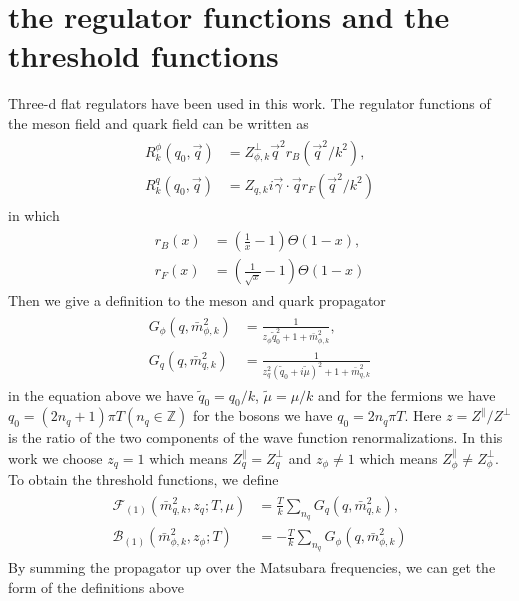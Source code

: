 \documentclass[%
reprint,
superscriptaddress,
showpacs,preprintnumbers,
 amsmath,amssymb,
 aps,
prd,
]{revtex4-1}
\begin{document}
\section{the regulator functions and the threshold functions}\label{a}
Three-d flat regulators have been used in this work. The regulator functions of the meson field and quark field can be 
written as
\begin{align}
\begin{split}
R^{\phi}_{k}(q_0,\vec{q})&=Z^{\bot}_{\phi,k}\vec{q}^2r_B(\vec{q}^2/k^2) ,\\
R^{q}_{k}(q_0,\vec{q})&=Z_{q,k}i\vec{\gamma}\cdot\vec{q}r_F(\vec{q}^2/k^2)
\end{split}
\end{align} 
in which
\begin{align}
\begin{split}
r_B(x)&=\left( \frac{1}{x}-1 \right)\Theta(1-x) ,\\
r_F(x)&=\left( \frac{1}{\sqrt{x}}-1 \right)\Theta(1-x)
\end{split}
\end{align} 
Then we give a definition to the meson and quark propagator
\begin{align}
\begin{split}
G_\phi(q,\bar{m}^{2}_{\phi,k})&=\frac{1}{z_\phi\tilde{q}^{2}_{0}+1+\bar{m}^{2}_{\phi,k}} ,\\
G_q(q,\bar{m}^{2}_{q,k})&=\frac{1}{z^{2}_{q}(\tilde{q}_0+i\tilde{\mu})^2+1+\bar{m}^{2}_{q,k}}
\end{split}
\end{align} 
in the equation above we have $\tilde{q}_0=q_0/k$, $\tilde{\mu}=\mu/k$ and for the fermions we have
$q_0=(2n_q+1)\pi T (n_q\in \mathbb{Z})$ for the bosons we have $q_0=2n_q\pi T$. Here $z=Z^\|/Z^\bot$ is the ratio of the 
two components of the wave function renormalizations. In this work we choose $z_q=1$ which means $Z^{\|}_{q}=
Z^{\bot}_{q}$ and $z_\phi\neq 1$ which means $Z^{\|}_{\phi}\neq Z^{\bot}_{\phi}$. To obtain the threshold functions, we 
define
\begin{align}
\begin{split}
\mathcal{F}_{(1)}(\bar{m}^{2}_{q,k},z_q;T,\mu)&=\frac{T}{k}\sum_{n_q}G_q(q,\bar{m}^{2}_{q,k}),\\
\mathcal{B}_{(1)}(\bar{m}^{2}_{\phi,k},z_\phi;T)&=-\frac{T}{k}\sum_{n_q}G_\phi(q,\bar{m}^{2}_{\phi,k})
\end{split}
\end{align} 
By summing the propagator up over the Matsubara frequencies, we can get the form of the definitions above
\end{document}
